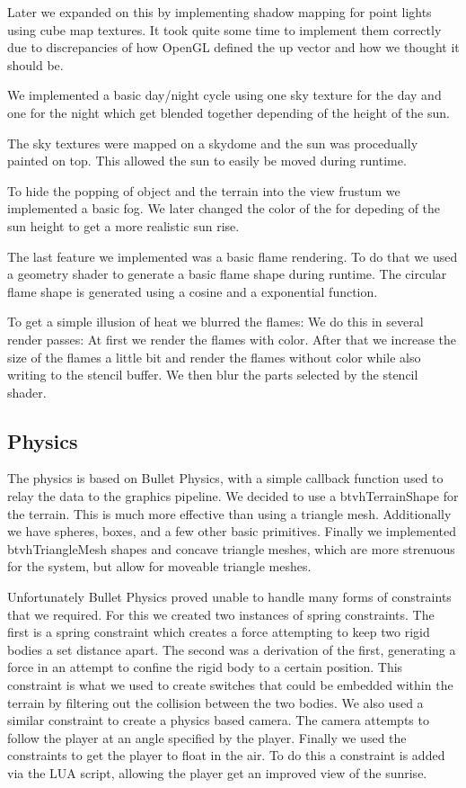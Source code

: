\documentclass[sponsored]{acmsiggraph}
\begin{document}
Later we expanded on this by implementing shadow mapping for point lights using cube map textures. It took quite some time to implement them correctly due to
discrepancies of how OpenGL defined the up vector and how we thought it should be.

We implemented a basic day/night cycle using one sky texture for the day and one for the night which get blended together depending of the height
of the sun.

The sky textures were mapped on a skydome and the sun was procedually painted on top. This allowed the sun to easily be moved during runtime.

To hide the popping of object and the terrain into the view frustum we implemented a basic fog.
We later changed the color of the for depeding of the sun height to get a more realistic sun rise.

The last feature we implemented was a basic flame rendering. 
To do that we used a geometry shader to generate a basic flame shape during runtime.
The circular flame shape is generated using a cosine and a exponential function.

To get a simple illusion of heat we blurred the flames:
We do this in several render passes:
At first we render the flames with color.
After that we increase the size of the flames a little bit and render the flames without color while also writing to the stencil buffer.
We then blur the parts selected by the stencil shader.

\subsection{Physics}

The physics is based on Bullet Physics, with a simple callback function used to relay the data to the graphics pipeline. We decided to use  a btvhTerrainShape for the terrain. This is much more effective than using a triangle mesh. Additionally we have spheres, boxes, and a few other basic primitives. Finally we implemented btvhTriangleMesh shapes and concave triangle meshes, which are more strenuous for the system, but allow for moveable triangle meshes.

Unfortunately Bullet Physics proved unable to handle many forms of constraints that we required. For this we created two instances of spring constraints. The first is a spring constraint which creates a force attempting to keep two rigid bodies a set distance apart. The second was a derivation of the first, generating a force in an attempt to confine the rigid body to a certain position. This constraint is what we used to create switches that could be embedded within the terrain by filtering out the collision between the two bodies.
We also used a similar constraint to create a physics based camera. The camera attempts to follow the player at an angle specified by the player. Finally we used the constraints to get the player to float in the air. To do this a constraint is added via the LUA script, allowing the player get an improved view of the sunrise.
\end{document}
